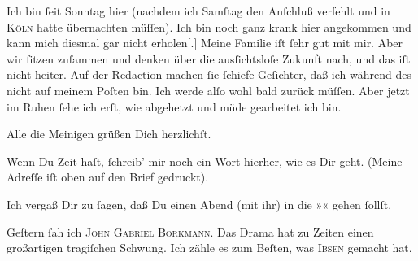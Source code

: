 \pstart
           Ich bin{ }ſeit Sonntag hier (nachdem ich Samſtag den Anſchluß verfehlt und in \textsc{Köln} hatte übernachten müſſen). Ich bin noch ganz krank hier angekommen und kann
               mich diesmal gar nicht erholen{[}.{]} Meine Familie iſt{ }ſehr gut mit
               mir. Aber wir{ }ſitzen zuſammen und denken über die ausſichtsloſe Zukunft nach, und das
               iſt nicht heiter. Auf der Redaction machen{ }ſie{ }ſchiefe Geſichter, daß ich während des \label{K_L02809-1v}\label{K_L02809-1} nicht auf meinem Poſten bin. Ich werde alſo wohl bald zurück {\pb}müſſen. Aber jetzt im Ruhen{ }ſehe ich erſt, wie
               abgehetzt und müde gearbeitet ich bin.\pend
           
\pstart
           Alle die Meinigen grüßen Dich herzlichſt.\pend
           
\pstart
           Wenn Du Zeit haſt,{ }ſchreib’ mir noch ein Wort hierher, wie es Dir geht. (Meine
               Adreſſe iſt oben auf den Brief gedruckt).\pend
           
\pstart
           Ich vergaß Dir zu{ }ſagen, daß Du einen Abend (mit ihr) in die »\label{K_L02809-2v}\label{K_L02809-2}« gehen{ }ſollſt.\pend
           
\pstart
           Geſtern{ }ſah ich \textsc{John Gabriel Borkmann}.  Das Drama hat zu Zeiten einen
               großartigen tragiſchen Schwung. Ich zähle es zum Beſten, was \strikeout{\textcolor{gray}{×}\-\textcolor{gray}{×}\-\textcolor{gray}{×}}{ }\textsc{Ibsen} gemacht hat.\pend
           
